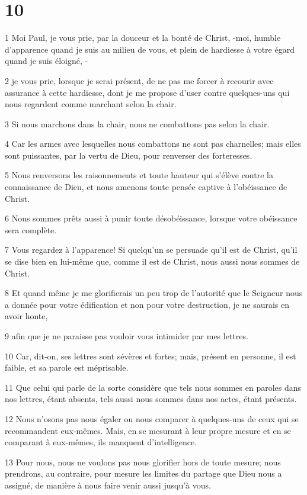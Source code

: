 \chapter{10}

\par 1 Moi Paul, je vous prie, par la douceur et la bonté de Christ, -moi, humble d'apparence quand je suis au milieu de vous, et plein de hardiesse à votre égard quand je suis éloigné, -
\par 2 je vous prie, lorsque je serai présent, de ne pas me forcer à recourir avec assurance à cette hardiesse, dont je me propose d'user contre quelques-uns qui nous regardent comme marchant selon la chair.
\par 3 Si nous marchons dans la chair, nous ne combattons pas selon la chair.
\par 4 Car les armes avec lesquelles nous combattons ne sont pas charnelles; mais elles sont puissantes, par la vertu de Dieu, pour renverser des forteresses.
\par 5 Nous renversons les raisonnements et toute hauteur qui s'élève contre la connaissance de Dieu, et nous amenons toute pensée captive à l'obéissance de Christ.
\par 6 Nous sommes prêts aussi à punir toute désobéissance, lorsque votre obéissance sera complète.
\par 7 Vous regardez à l'apparence! Si quelqu'un se persuade qu'il est de Christ, qu'il se dise bien en lui-même que, comme il est de Christ, nous aussi nous sommes de Christ.
\par 8 Et quand même je me glorifierais un peu trop de l'autorité que le Seigneur nous a donnée pour votre édification et non pour votre destruction, je ne saurais en avoir honte,
\par 9 afin que je ne paraisse pas vouloir vous intimider par mes lettres.
\par 10 Car, dit-on, ses lettres sont sévères et fortes; mais, présent en personne, il est faible, et sa parole est méprisable.
\par 11 Que celui qui parle de la sorte considère que tels nous sommes en paroles dans nos lettres, étant absents, tels aussi nous sommes dans nos actes, étant présents.
\par 12 Nous n'osons pas nous égaler ou nous comparer à quelques-uns de ceux qui se recommandent eux-mêmes. Mais, en se mesurant à leur propre mesure et en se comparant à eux-mêmes, ils manquent d'intelligence.
\par 13 Pour nous, nous ne voulons pas nous glorifier hors de toute mesure; nous prendrons, au contraire, pour mesure les limites du partage que Dieu nous a assigné, de manière à nous faire venir aussi jusqu'à vous.
